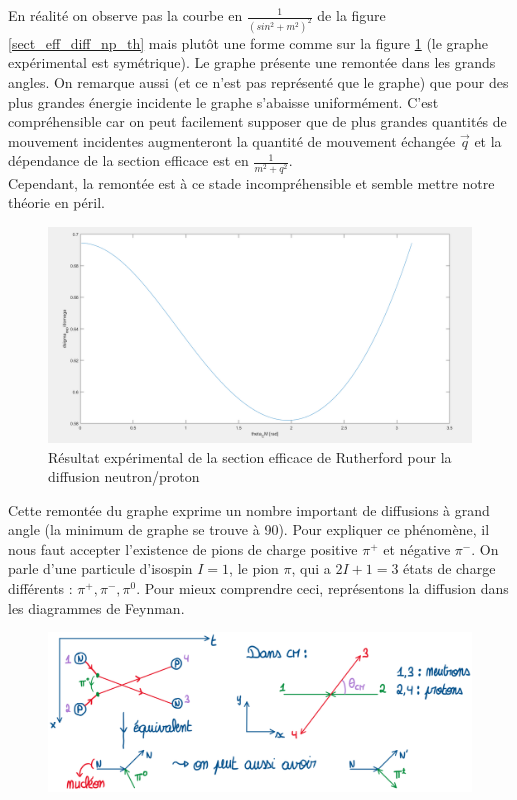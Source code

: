 En réalité on observe pas la courbe en $\frac{1}{(sin^2 + m^2)^2}$ de la figure \ref{sect_eff_diff_np_th} mais plutôt une forme comme sur la figure \ref{sect_eff_diff_np_exp} (le graphe expérimental est symétrique). Le graphe présente une remontée dans les grands angles. On remarque aussi (et ce n'est pas représenté que le graphe) que pour des plus grandes énergie incidente le graphe s'abaisse uniformément. C'est compréhensible car on peut facilement supposer que de plus grandes quantités de mouvement incidentes augmenteront la quantité de mouvement échangée $\Vec{q}$ et la dépendance de la section efficace est en $\frac{1}{m^2 + q^2}$.\\
Cependant, la remontée est à ce stade incompréhensible et semble mettre notre théorie en péril.\\
\begin{figure}[H]
    \centering
    \includegraphics[scale = 0.3]{Images4/Diffusion3.PNG}
    \caption{Résultat expérimental de la section efficace de Rutherford pour la diffusion neutron/proton}
    \label{sect_eff_diff_np_exp}
\end{figure}
Cette remontée du graphe exprime un nombre important de diffusions à grand angle (la minimum de graphe se trouve à 90\degree). Pour expliquer ce phénomène, il nous faut accepter l'existence de pions de charge positive $\pi^+$ et négative $\pi^-$. On parle d'une particule d'isospin $I=1$, le pion $\pi$, qui a $2I +1 =3$ états de charge différents : $\pi^+,\pi^-,\pi^0$. Pour mieux comprendre ceci, représentons la diffusion dans les diagrammes de Feynman.
\begin{figure}[H]
    \centering
    \includegraphics[scale = 0.5]{Images4/Feynmann_pi.png}
\end{figure}
